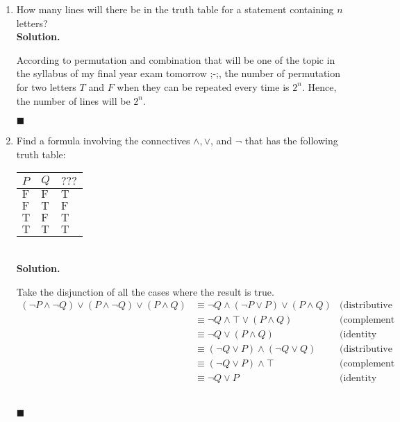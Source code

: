 \documentclass{report}
\newcommand{\sol}{\vspace{1em}\\\textbf{Solution.}\vspace{0.5em}}
\newcommand{\qed}{\ \\\strut\hfill$\blacksquare$\vspace{1em}}
\begin{document}
\begin{enumerate}[leftmargin=*]
    \item How many lines will there be in the truth table for a statement containing $n$
          letters? \sol{}

          According to permutation and combination that will be one of the topic in the
          syllabus of my final year exam tomorrow ;-;, the number of permutation for two
          letters $T$ and $F$ when they can be repeated every time is $2^n$. Hence, the
          number of lines will be $2^n$. \qed
    \item Find a formula involving the connectives $\wedge, \vee$, and $\neg$ that has
          the following truth table:
          \begin{center}
              \begin{tabular}{lll}
                  $P$                 & $Q$          & $? ? ?$      \\
                  \hline $\mathrm{F}$ & $\mathrm{F}$ & $\mathrm{T}$ \\
                  $\mathrm{F}$        & $\mathrm{T}$ & $\mathrm{F}$ \\
                  $\mathrm{T}$        & $\mathrm{F}$ & $\mathrm{T}$ \\
                  $\mathrm{T}$        & $\mathrm{T}$ & $\mathrm{T}$
              \end{tabular}
          \end{center}
          ‎\sol{}

          Take the disjunction of all the cases where the result is true.
          \begin{align*}
              (\neg P \wedge \neg Q) \vee (P \wedge \neg Q) \vee (P \wedge Q) & \equiv \neg Q \wedge (\neg P \vee P) \vee (P \wedge Q) & \text{(distributive law)} \\
                                                                              & \equiv \neg Q \wedge \top \vee (P \wedge Q)            & \text{(complement law)}   \\
                                                                              & \equiv \neg Q \vee (P \wedge Q)                        & \text{(identity law)}     \\
                                                                              & \equiv (\neg Q \vee P) \wedge (\neg Q \vee Q)          & \text{(distributive law)} \\
                                                                              & \equiv (\neg Q \vee P) \wedge \top                     & \text{(complement law)}   \\
                                                                              & \equiv \neg Q \vee P                                   & \text{(identity law)}
          \end{align*}\vspace{-2em}\qed


\end{enumerate}
\end{document}
